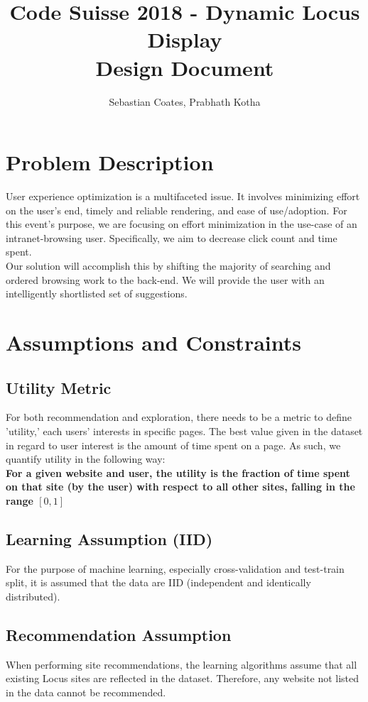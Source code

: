 \documentclass{article}
\title{\textbf{Code Suisse 2018 - Dynamic Locus Display \\ Design Document}}
\author{Sebastian Coates, Prabhath Kotha}
\begin{document}
 
\maketitle{} 
\setlength{\parindent}{0pt}


\clearpage
\section*{Problem Description}
User experience optimization is a multifaceted issue. It involves minimizing effort on the user's end, timely and reliable rendering, and ease of use/adoption. For this event's purpose, we are focusing on effort minimization in the use-case of an intranet-browsing user. Specifically, we aim to decrease click count and time spent. \\

Our solution will accomplish this by shifting the majority of searching and ordered browsing work to the back-end. We will provide the user with an intelligently shortlisted set of suggestions.

\section*{Assumptions and Constraints}
\subsection*{Utility Metric}
For both recommendation and exploration, there needs to be a metric to define 
'utility,' each users' interests in specific pages. The best value given in the
dataset in regard to user interest is the amount of time spent on a page. As such,
we quantify utility in the following way: \\ 
\textbf{For a given website and user, the utility is the fraction of time spent 
on that site (by the user) with respect to all other sites, falling in the range $[0,1]$} \\ 

\subsection*{Learning Assumption (IID)} 
For the purpose of machine learning, especially cross-validation and test-train split,
it is assumed that the data are IID (independent and identically distributed). 

\subsection*{Recommendation Assumption} 
When performing site recommendations, the learning algorithms assume that all
existing Locus sites are reflected in the dataset. Therefore, any website not 
listed in the data cannot be recommended. \\
\end{document}
